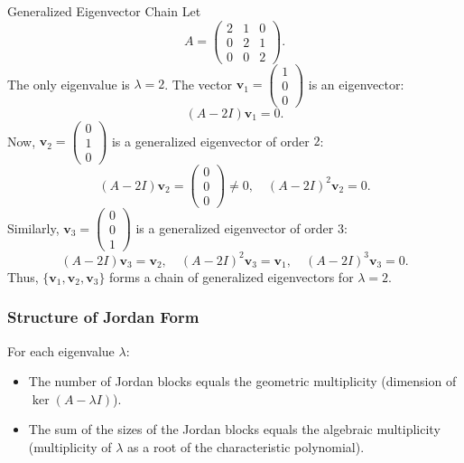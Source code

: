 \begin{example}{Generalized Eigenvector Chain}
    Let
    \[
        A = \begin{pmatrix}
            2 & 1 & 0 \\
            0 & 2 & 1 \\
            0 & 0 & 2
        \end{pmatrix}.
    \]
    The only eigenvalue is \(\lambda=2\). The vector \(\mathbf{v}_1 = \begin{pmatrix}1\\0\\0\end{pmatrix}\) is an eigenvector:
    \[
        (A-2I)\mathbf{v}_1 = 0.
    \]
    Now, \(\mathbf{v}_2 = \begin{pmatrix}0\\1\\0\end{pmatrix}\) is a generalized eigenvector of order \(2\):
    \[
        (A-2I)\mathbf{v}_2 = \begin{pmatrix}0\\0\\0\end{pmatrix} \neq 0, \quad (A-2I)^2\mathbf{v}_2 = 0.
    \]
    Similarly, \(\mathbf{v}_3 = \begin{pmatrix}0\\0\\1\end{pmatrix}\) is a generalized eigenvector of order \(3\):
    \[
        (A-2I)\mathbf{v}_3 = \mathbf{v}_2, \quad (A-2I)^2\mathbf{v}_3 = \mathbf{v}_1, \quad (A-2I)^3\mathbf{v}_3 = 0.
    \]
    Thus, \(\{\mathbf{v}_1, \mathbf{v}_2, \mathbf{v}_3\}\) forms a chain of generalized eigenvectors for \(\lambda=2\).
\end{example}

\subsubsection{Structure of Jordan Form}
For each eigenvalue \(\lambda\):
\begin{itemize}[nosep]
    \item The number of Jordan blocks equals the geometric multiplicity (dimension of \(\ker(A-\lambda I)\)).
    \item The sum of the sizes of the Jordan blocks equals the algebraic multiplicity (multiplicity of \(\lambda\) as a root of the characteristic polynomial).
\end{itemize}

